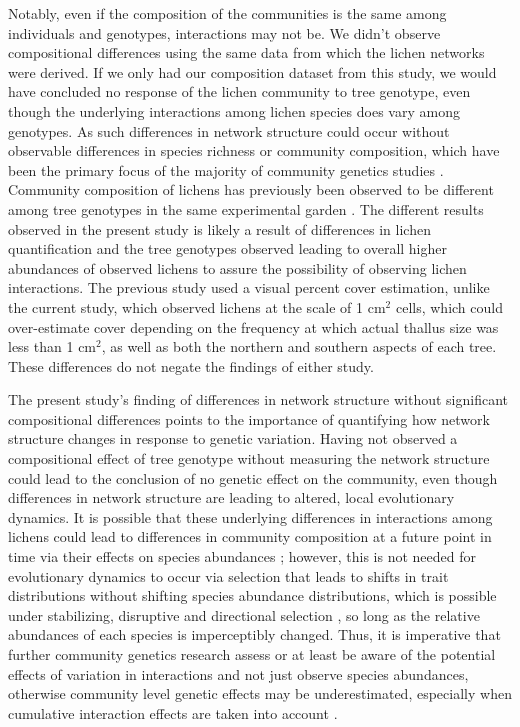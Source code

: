 \documentclass[fleqn,12pt]{olplainarticle}
\begin{document}
Notably, even if the composition of the communities is the same among
individuals and genotypes, interactions may not be. We didn't observe
compositional differences using the same data from which the lichen
networks were derived. If we only had our composition dataset from
this study, we would have concluded no response of the lichen
community to tree genotype, even though the underlying interactions
among lichen species does vary among genotypes. As such differences in
network structure could occur without observable differences in
species richness or community composition, which have been the primary
focus of the majority of community genetics studies
\citep{Whitham2020IntraspecificEvolution}. Community composition
of lichens has previously been observed to be different among tree
genotypes in the same experimental garden \citep{Lamit2011,
  Lamit2015a}. The different results observed in the present study is
likely a result of differences in lichen quantification and the tree
genotypes observed leading to overall higher abundances of observed
lichens to assure the possibility of observing lichen
interactions. The previous study used a visual percent cover
estimation, unlike the current study, which observed lichens at the
scale of 1 cm$^2$ cells, which could over-estimate cover depending on
the frequency at which actual thallus size was less than 1 cm$^2$, as
well as both the northern and southern aspects of each tree. These
differences do not negate the findings of either study. 

The present study's finding of differences in network structure
without significant compositional differences points to the importance
of quantifying how network structure changes in response to genetic
variation. Having not observed a compositional effect of tree genotype
without measuring the network structure could lead to the conclusion
of no genetic effect on the community, even though differences in
network structure are leading to altered, local evolutionary
dynamics. It is possible that these underlying differences in
interactions among lichens could lead to differences in community
composition at a future point in time via their effects on species
abundances \citep{Shuster2006COMMUNITYSTRUCTURE}; however, this is not
needed for evolutionary dynamics to occur via selection that leads to
shifts in trait distributions without shifting species abundance
distributions, which is possible under stabilizing, disruptive and
directional selection \citep{Conner2004ATextbook}, so long as the
relative abundances of each species is imperceptibly changed. Thus, it
is imperative that further community genetics research assess or at
least be aware of the potential effects of variation in interactions
and not just observe species abundances, otherwise community level
genetic effects may be underestimated, especially when cumulative
interaction effects are taken into account
\citep{Borrett2007FunctionalProliferation, Borrett2010}.
\end{document}
